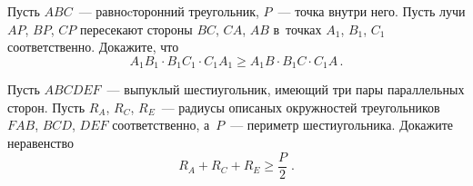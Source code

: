 \begin{problems}
\item
Пусть $ABC$~--- равноcторонний треугольник, $P$~--- точка внутри него.
Пусть лучи $AP$, $BP$, $CP$ пересекают стороны $BC$, $CA$, $AB$ в~точках
$A_1$, $B_1$, $C_1$ соответственно.
Докажите, что
\[
    A_1 B_1 \cdot B_1 C_1 \cdot C_1 A_1
\geq
    A_1 B \cdot B_1 C \cdot C_1 A
\, . \]

\item
Пусть $ABCDEF$~--- выпуклый шестиугольник, имеющий три пары параллельных
сторон.
Пусть $R_A$, $R_C$, $R_E$~--- радиусы описаных окружностей треугольников
$FAB$, $BCD$, $DEF$ соответственно, а~$P$~--- периметр шестиугольника.
Докажите неравенство
\[
    R_A + R_C + R_E
\geq
    \frac{P}{2}
\; . \]

\end{problems}

\endgroup %

